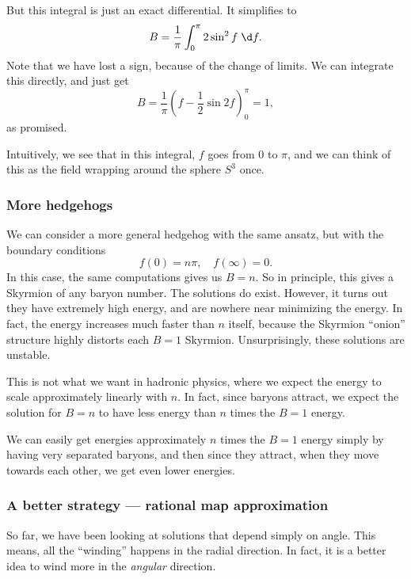 \documentclass[a4paper]{article}
\begin{document}
But this integral is just an exact differential. It simplifies to
\[
  B = \frac{1}{\pi} \int_0^\pi 2 \sin^2 f \;\d f.
\]
Note that we have lost a sign, because of the change of limits. We can integrate this directly, and just get
\[
  B = \frac{1}{\pi}\left(f - \frac{1}{2} \sin 2f\right)^\pi_0 = 1,
\]
as promised.

Intuitively, we see that in this integral, $f$ goes from $0$ to $\pi$, and we can think of this as the field wrapping around the sphere $S^3$ once.

\subsubsection*{More hedgehogs}
We can consider a more general hedgehog with the same ansatz, but with the boundary conditions
\[
  f(0) = n\pi,\quad f(\infty) = 0.
\]
In this case, the same computations gives us $B = n$. So in principle, this gives a Skyrmion of any baryon number. The solutions do exist. However, it turns out they have extremely high energy, and are nowhere near minimizing the energy. In fact, the energy increases much faster than $n$ itself, because the Skyrmion ``onion'' structure highly distorts each $B = 1$ Skyrmion. Unsurprisingly, these solutions are unstable.

This is not what we want in hadronic physics, where we expect the energy to scale approximately linearly with $n$. In fact, since baryons attract, we expect the solution for $B = n$ to have less energy than $n$ times the $B = 1$ energy.

We can easily get energies approximately $n$ times the $B = 1$ energy simply by having very separated baryons, and then since they attract, when they move towards each other, we get even lower energies.


\subsubsection*{A better strategy --- rational map approximation}
So far, we have been looking at solutions that depend simply on angle. This means, all the ``winding'' happens in the radial direction. In fact, it is a better idea to wind more in the \emph{angular} direction.
\end{document}
